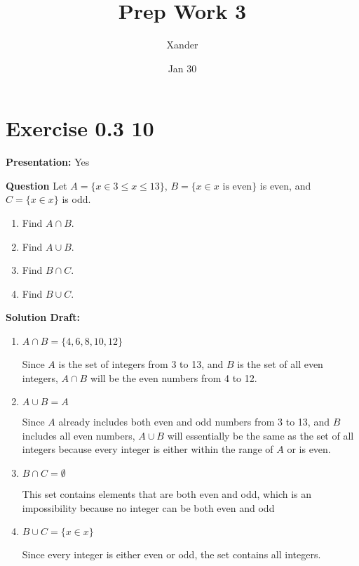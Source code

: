 \documentclass{article}
\title{Prep Work 3}
\author{Xander}
\date{Jan 30}
\begin{document}
\maketitle



\section*{Exercise 0.3 10}  

\noindent\textbf{Presentation:} Yes

\vspace{0.5cm} %

\noindent\textbf{Question} 
Let $A = \{x \in 3 \le x \le 13\}$, $B = \{x \in x \mbox{ is even} \}$ is even, and $C = \{x \in x \} $ is odd.
\begin{enumerate}
    \item Find $A \cap B$.
    
    \item Find $A \cup B$.

    \item Find $B \cap C$.

    \item Find $B \cup C$.
\end{enumerate}
\noindent\textbf{Solution Draft:} 
\begin{enumerate}
    \item $A \cap B=\{4,6,8,10,12\}$
    
    Since $A$ is the set of integers from 3 to 13, and $B$ is the set of all even integers, $A \cap B$ will be the even numbers from 4 to 12.
    \item $A \cup B=A$

    Since $A$ already includes both even and odd numbers from 3 to 13, and $B$ includes all even numbers, $A \cup B$ will essentially be the same as the set of all integers because every integer is either within the range of $A$ or is even.

    \item $B \cap C = \emptyset$

    This set contains elements that are both even and odd, which is an impossibility because no integer can be both even and odd

    \item $B \cup C= \{ x \in x \}$
    
    Since every integer is either even or odd, the set contains all integers.

\end{enumerate}
\end{document}
